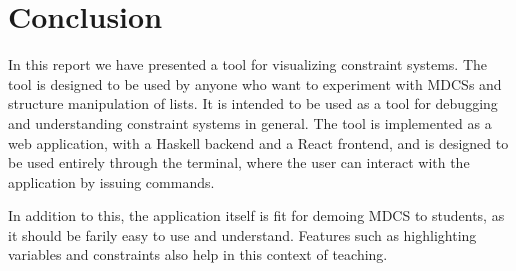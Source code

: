 \documentclass[11pt, a4paper]{article}
\begin{document}
\section{Conclusion}
\label{sec:conclusion}
In this report we have presented a tool for visualizing constraint systems. The tool is designed to be used by anyone who want to experiment with MDCSs and structure manipulation of lists. It is intended to be used as a tool for debugging and understanding constraint systems in general. The tool is implemented as a web application, with a Haskell backend and a React frontend, and is designed to be used entirely through the terminal, where the user can interact with the application by issuing commands.

In addition to this, the application itself is fit for demoing MDCS to students, as it should be farily easy to use and understand. Features such as highlighting variables and constraints also help in this context of teaching. 

\clearpage


\end{document}
